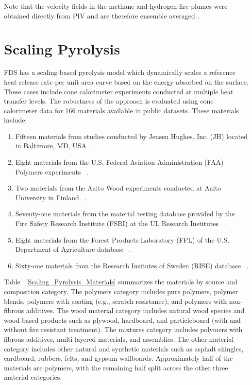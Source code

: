 Note that the velocity fields in the methane and hydrogen fire plumes were obtained directly from PIV and are therefore ensemble averaged \cite{Tieszen:2004,Tieszen:2002}.

\section{Scaling Pyrolysis}
\label{exp_Scaling Pyrolysis}

FDS has a scaling-based pyrolysis model which dynamically scales a reference heat release rate per unit area curve based on the energy absorbed on the surface.
These cases include cone calorimeter experiments conducted at multiple heat transfer levels.
The robustness of the approach is evaluated using cone calorimeter data for 166 materials available in public datasets.
These materials include:
\begin{enumerate}
\item Fifteen materials from studies conducted by Jensen Hughes, Inc. (JH) located in Baltimore, MD, USA ~\cite{Luo:FRA2019,Lattimer:NIJ19}.
\item Eight materials from the U.S. Federal Aviation Administration (FAA) Polymers experiments ~\cite{Stoliarov:CF2009,Stoliarov:FM2012}.
\item Two materials from the Aalto Wood experiments conducted at Aalto University in Finland ~\cite{Rinta-Paavola:2023}.
\item Seventy-one materials from the material testing database provided by the Fire Safety Research Institute (FSRI) at the UL Research Institutes ~\cite{McKinnon:FSRI2023_Data}.
\item Eight materials from the Forest Products Laboratory (FPL) of the U.S. Department of Agriculture database ~\cite{FPL:Fire_Database}.
\item Sixty-one materials from the Research Insitutes of Sweden (RISE) database ~\cite{RISE:Fire_Database}.
\end{enumerate}
Table ~\ref{Scaling_Pyrolysis_Materials} summarizes the materials by source and composition category.
The polymers category includes pure polymers, polymer blends, polymers with coating (e.g., scratch resistance), and polymers with non-fibrous additives.
The wood material category includes natural wood species and wood-based products such as plywood, hardboard, and particleboard (with and without fire resistant treatment).
The mixtures category includes polymers with fibrous additives, multi-layered materials, and assemblies.
The other material category includes other natural and synthetic materials such as asphalt shingles, cardboard, rubbers, felts, and gypsum wallboards.
Approximately half of the materials are polymers, with the remaining half split across the other three material categories.

